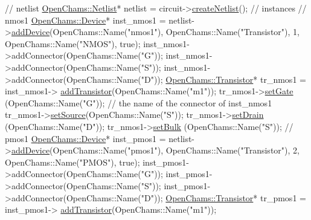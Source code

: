 \begin{DoxyCodeInclude}
    \textcolor{comment}{// netlist}
    \hyperlink{class_open_chams_1_1_netlist}{OpenChams::Netlist}* netlist = circuit->\hyperlink{class_open_chams_1_1_circuit_a3f11671c7ea7b4e2cc3487bd7954b667}{createNetlist}();
    \textcolor{comment}{//  instances}
    \textcolor{comment}{//   nmos1}
    \hyperlink{class_open_chams_1_1_device}{OpenChams::Device}* inst\_nmos1 = netlist->\hyperlink{class_open_chams_1_1_netlist_a8e1798a2516c32fbab629ce8d60d4b1d}{addDevice}(OpenChams::Name(\textcolor{stringliteral}{"nmos1"}), 
      OpenChams::Name(\textcolor{stringliteral}{"Transistor"}), 1, OpenChams::Name(\textcolor{stringliteral}{"NMOS"}), \textcolor{keyword}{true});
    inst\_nmos1->addConnector(OpenChams::Name(\textcolor{stringliteral}{"G"}));
    inst\_nmos1->addConnector(OpenChams::Name(\textcolor{stringliteral}{"S"}));
    inst\_nmos1->addConnector(OpenChams::Name(\textcolor{stringliteral}{"D"}));
    \hyperlink{class_open_chams_1_1_transistor}{OpenChams::Transistor}* tr\_nmos1 = inst\_nmos1->
      \hyperlink{class_open_chams_1_1_device_ad45d34f8765dd113a5b12289efe66c07}{addTransistor}(OpenChams::Name(\textcolor{stringliteral}{"m1"}));
    tr\_nmos1->\hyperlink{class_open_chams_1_1_transistor_a705b53a51f0e265533b228f6e8beaf50}{setGate}  (OpenChams::Name(\textcolor{stringliteral}{"G"})); \textcolor{comment}{// the name of the connector of inst\_nmos1}
    tr\_nmos1->\hyperlink{class_open_chams_1_1_transistor_abc4a5d86e639ea13e27551722e2f9c17}{setSource}(OpenChams::Name(\textcolor{stringliteral}{"S"}));
    tr\_nmos1->\hyperlink{class_open_chams_1_1_transistor_a72ff8491040e3fdc1c8bd62b2392ab82}{setDrain} (OpenChams::Name(\textcolor{stringliteral}{"D"}));
    tr\_nmos1->\hyperlink{class_open_chams_1_1_transistor_a1484abe63e3f8ffbc2911c5230fa7091}{setBulk}  (OpenChams::Name(\textcolor{stringliteral}{"S"}));
    \textcolor{comment}{//   pmos1}
    \hyperlink{class_open_chams_1_1_device}{OpenChams::Device}* inst\_pmos1 = netlist->\hyperlink{class_open_chams_1_1_netlist_a8e1798a2516c32fbab629ce8d60d4b1d}{addDevice}(OpenChams::Name(\textcolor{stringliteral}{"pmos1"}), 
      OpenChams::Name(\textcolor{stringliteral}{"Transistor"}), 2, OpenChams::Name(\textcolor{stringliteral}{"PMOS"}), \textcolor{keyword}{true});
    inst\_pmos1->addConnector(OpenChams::Name(\textcolor{stringliteral}{"G"}));
    inst\_pmos1->addConnector(OpenChams::Name(\textcolor{stringliteral}{"S"}));
    inst\_pmos1->addConnector(OpenChams::Name(\textcolor{stringliteral}{"D"}));
    \hyperlink{class_open_chams_1_1_transistor}{OpenChams::Transistor}* tr\_pmos1 = inst\_pmos1->
      \hyperlink{class_open_chams_1_1_device_ad45d34f8765dd113a5b12289efe66c07}{addTransistor}(OpenChams::Name(\textcolor{stringliteral}{"m1"}));

\end{DoxyCodeInclude}
